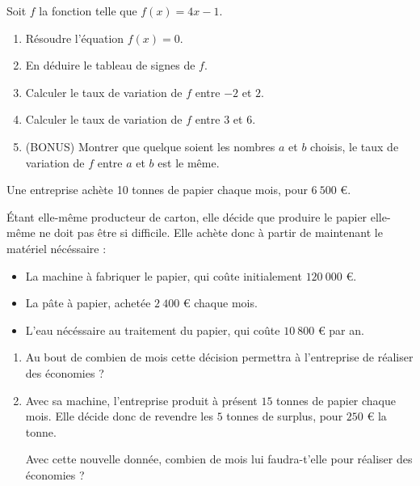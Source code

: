 \documentclass[
	classe=1 STI2D,
	gray,
	surFeuille,
	headerTitle=Évaluation\space Chapitre\space 2
]{évaluation}
\begin{document}
\begin{exercice}
	Soit $f$ la fonction telle que $f(x) = 4x - 1$.

	\begin{enumerate}
		\item Résoudre l'équation $f(x) = 0$.
		\item En déduire le tableau de signes de $f$.
		\item Calculer le taux de variation de $f$ entre $-2$ et $2$.
		\item Calculer le taux de variation de $f$ entre $3$ et $6$.
		\item (BONUS) Montrer que quelque soient les nombres $a$ et $b$ choisis, le taux de variation de $f$ entre $a$ et $b$ est le même.
	\end{enumerate}
\end{exercice}

\begin{exercice}
	Une entreprise achète 10 tonnes de papier chaque mois, pour $6\ 500$ €. \smallskip

	Étant elle-même producteur de carton, elle décide que produire le papier elle-même ne doit pas être si difficile. Elle achète donc à partir de maintenant le matériel nécéssaire :

	\begin{itemize}
		\item La machine à fabriquer le papier, qui coûte initialement $120\ 000$ €.
		\item La pâte à papier, achetée $2\ 400$ € chaque mois.
		\item L'eau nécéssaire au traitement du papier, qui coûte $10\ 800$ € par an.
	\end{itemize}

	\begin{enumerate}
		\item Au bout de combien de mois cette décision permettra à l'entreprise de réaliser des économies ?
		\item Avec sa machine, l'entreprise produit à présent $15$ tonnes de papier chaque mois. Elle décide donc de revendre les $5$ tonnes de surplus, pour $250$ € la tonne.

		      Avec cette nouvelle donnée, combien de mois lui faudra-t'elle pour réaliser des économies ?
	\end{enumerate}
\end{exercice}
\end{document}
